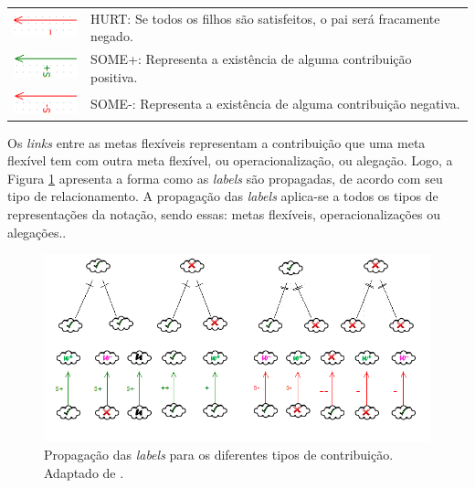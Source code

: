\begin{table}[h!]
\begin{tabular}{@{}cl@{}}
		\multirow{2}{*}{\includegraphics[scale=0.9]{figuras/Hurt.png}} & \multirow{2}{*}{HURT: Se todos os filhos são satisfeitos, o pai será fracamente negado.} \\
		&  \\ \hline
		\multirow{2}{*}{\includegraphics[scale=0.9]{figuras/SomeMais.png}} & \multirow{2}{*}{SOME+: Representa a existência de alguma contribuição positiva.} \\
		&  \\ \hline
		\multirow{2}{*}{\includegraphics[scale=0.9]{figuras/SomeMenos.png}} & \multirow{2}{*}{SOME-: Representa a existência de alguma contribuição negativa.} \\
		&  \\ \hline
	\end{tabular}
\end{table}

\pagebreak

Os \textit{links} entre as metas flexíveis representam a contribuição que uma meta flexível tem com outra meta flexível, ou operacionalização, ou alegação. Logo, a Figura \ref{catalogoDeAvaliação} apresenta a forma como as \textit{labels} são propagadas, de acordo com seu tipo de relacionamento. A propagação das \textit{labels} aplica-se a todos os tipos de representações da notação, sendo essas: metas flexíveis, operacionalizações ou alegações.. 

\begin{figure}[h!]
	\centering
	\includegraphics[keepaspectratio=true,scale=0.8]{figuras/catalogoDeAvaliacao.png}
	\caption{Propagação das \textit{labels} para os diferentes tipos de contribuição. Adaptado de \cite{chung2012non}.}
	\label{catalogoDeAvaliação}
\end{figure} 

